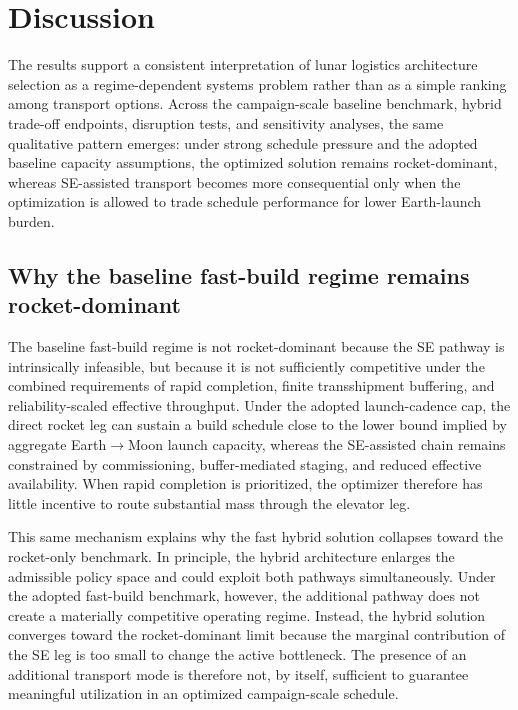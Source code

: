 \documentclass[12pt]{article}
\begin{document}
\section{Discussion}
\label{sec:discussion}

The results support a consistent interpretation of lunar logistics architecture selection as a regime-dependent systems problem rather than as a simple ranking among transport options. Across the campaign-scale baseline benchmark, hybrid trade-off endpoints, disruption tests, and sensitivity analyses, the same qualitative pattern emerges: under strong schedule pressure and the adopted baseline capacity assumptions, the optimized solution remains rocket-dominant, whereas SE-assisted transport becomes more consequential only when the optimization is allowed to trade schedule performance for lower Earth-launch burden.

\subsection{Why the baseline fast-build regime remains rocket-dominant}
\label{subsec:discussion_baseline}

The baseline fast-build regime is not rocket-dominant because the SE pathway is intrinsically infeasible, but because it is not sufficiently competitive under the combined requirements of rapid completion, finite transshipment buffering, and reliability-scaled effective throughput. Under the adopted launch-cadence cap, the direct rocket leg can sustain a build schedule close to the lower bound implied by aggregate Earth$\to$Moon launch capacity, whereas the SE-assisted chain remains constrained by commissioning, buffer-mediated staging, and reduced effective availability. When rapid completion is prioritized, the optimizer therefore has little incentive to route substantial mass through the elevator leg.

This same mechanism explains why the fast hybrid solution collapses toward the rocket-only benchmark. In principle, the hybrid architecture enlarges the admissible policy space and could exploit both pathways simultaneously. Under the adopted fast-build benchmark, however, the additional pathway does not create a materially competitive operating regime. Instead, the hybrid solution converges toward the rocket-dominant limit because the marginal contribution of the SE leg is too small to change the active bottleneck. The presence of an additional transport mode is therefore not, by itself, sufficient to guarantee meaningful utilization in an optimized campaign-scale schedule.
\end{document}
